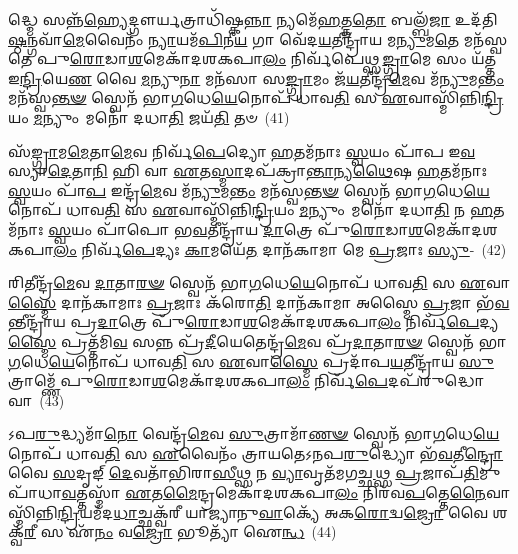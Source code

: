 𑌦𑍍𑌧𑍍𑌮𑍇 𑌸𑌨𑍍𑌨᳴\-\ul{𑌹𑍍𑌯𑍇}\-𑌦𑍍𑌗𑍗𑌰𑍍𑌯𑌤𑍍𑌰𑌾𑌧𑌿᳴𑌷𑍍𑌕\-\ul{𑌨𑍍𑌨𑌾} 𑌨𑍍𑌯𑌮𑍇᳴\-\ul{𑌹}\-𑌤𑍍𑌤\-\ul{𑌤𑍋} 𑌬𑌲𑍍𑌬᳴\-\ul{𑌜𑌾} 𑌉𑌦᳴𑌤𑌿\-\ul{𑌷𑍍𑌠}\-𑌨𑍍𑌗𑌵𑌾᳴\-\ul{𑌮𑍇}\-𑌵𑍈𑌨𑌂᳴ \ul{𑌨𑍍𑌯𑌾}\-𑌯𑌮᳴\-\ul{𑌪𑌿}\-𑌨𑍀\-\ul{𑌯} 𑌗𑌾 𑌵𑍇᳴𑌦\-\ul{𑌯}\-𑌤𑍀𑌨𑍍𑌦𑍍𑌰𑌾᳴𑌯 𑌮\-\ul{𑌨𑍍𑌯𑍁}\-𑌮\-\ul{𑌤𑍇} 𑌮𑌨᳴𑌸𑍍𑌵𑌤𑍇 𑌪𑍁\-\ul{𑌰𑍋}\-𑌡𑌾\-\ul{𑌶}\-𑌮𑍇𑌕𑌾᳴\-𑌦𑌶\-𑌕𑌪𑌾\-\ul{𑌲𑌂} 𑌨𑌿𑌰𑍍𑌵᳴𑌪𑍇𑌥𑍍𑌸\-\ul{𑌙𑍍𑌗𑍍𑌰𑌾}\-𑌮𑍇 𑌸𑌂 𑌯᳴𑌤𑍍𑌤 𑌇\-\ul{𑌨𑍍𑌦𑍍𑌰𑌿}\-𑌯𑍇\-\ul{𑌣} 𑌵𑍈 \ul{𑌮}\-𑌨𑍍𑌯𑍁\-\ul{𑌨𑌾} 𑌮𑌨᳴𑌸𑌾 𑌸\-\ul{𑌙𑍍𑌗𑍍𑌰𑌾}\-𑌮𑌂 𑌜᳴\-\ul{𑌯}\-𑌤𑍀𑌨𑍍𑌦𑍍𑌰᳴\-\ul{𑌮𑍇}\-𑌵 𑌮᳴\-\ul{𑌨𑍍𑌯𑍁}\-𑌮\-\ul{𑌨𑍍𑌤𑌂} 𑌮𑌨᳴𑌸𑍍𑌵\-\ul{𑌨𑍍𑌤}\-\-\ul{𑍟} 𑌸𑍍𑌵𑍇𑌨᳴ 𑌭𑌾\-\ul{𑌗}\-𑌧𑍇\-\ul{𑌯𑍇}\-𑌨𑍋𑌪᳴ 𑌧𑌾𑌵\-\ul{𑌤𑌿} 𑌸 \ul{𑌏}\-𑌵𑌾𑌸𑍍𑌮𑌿᳴𑌨𑍍𑌨𑌿\-\ul{𑌨𑍍𑌦𑍍𑌰𑌿}\-𑌯𑌂 \ul{𑌮}\-𑌨𑍍𑌯𑍁𑌂 𑌮𑌨𑍋᳴ 𑌦𑌧𑌾\-\ul{𑌤𑌿} 𑌜𑌯᳴\-\ul{𑌤𑌿} 𑌤𑍞~(41)

𑌸᳴\-\ul{𑌙𑍍𑌗𑍍𑌰𑌾}\-𑌮\-\ul{𑌮𑍇}\-𑌤𑌾\-\ul{𑌮𑍇}\-𑌵 𑌨𑌿𑌰𑍍𑌵᳴\-\ul{𑌪𑍇}\-𑌦𑍍𑌯𑍋 \ul{𑌹}\-𑌤𑌮᳴𑌨𑌾𑌃 \ul{𑌸𑍍𑌵}\-𑌯𑌂 𑌪𑌾᳴𑌪 𑌇\-\ul{𑌵} 𑌸𑍍𑌯𑌾\-\ul{𑌦𑍇}\-𑌤𑌾\-\ul{𑌨𑌿} 𑌹𑌿 𑌵𑌾 \ul{𑌏}\-𑌤\-\ul{𑌸𑍍𑌮𑌾}\-𑌦𑌪᳴𑌕𑍍𑌰𑌾\-\ul{𑌨𑍍𑌤𑌾}\-𑌨𑍍𑌯\-\ul{𑌥𑍈}\-𑌷 \ul{𑌹}\-𑌤𑌮᳴𑌨𑌾𑌃 \ul{𑌸𑍍𑌵}\-𑌯𑌂 𑌪𑌾᳴\-\ul{𑌪} 𑌇𑌨𑍍𑌦𑍍𑌰᳴\-\ul{𑌮𑍇}\-𑌵 𑌮᳴\-\ul{𑌨𑍍𑌯𑍁}\-𑌮\-\ul{𑌨𑍍𑌤𑌂} 𑌮𑌨᳴𑌸𑍍𑌵\-\ul{𑌨𑍍𑌤}\-\-\ul{𑍟} 𑌸𑍍𑌵𑍇𑌨᳴ 𑌭𑌾\-\ul{𑌗}\-𑌧𑍇\-\ul{𑌯𑍇}\-𑌨𑍋𑌪᳴ 𑌧𑌾𑌵\-\ul{𑌤𑌿} 𑌸 \ul{𑌏}\-𑌵𑌾𑌸𑍍𑌮𑌿᳴𑌨𑍍𑌨𑌿\-\ul{𑌨𑍍𑌦𑍍𑌰𑌿}\-𑌯𑌂 \ul{𑌮}\-𑌨𑍍𑌯𑍁𑌂 𑌮𑌨𑍋᳴ 𑌦𑌧𑌾\-\ul{𑌤𑌿} 𑌨 \ul{𑌹}\-𑌤𑌮᳴𑌨𑌾𑌃 \ul{𑌸𑍍𑌵}\-𑌯𑌂 𑌪𑌾᳴𑌪𑍋 𑌭\-\ul{𑌵}\-𑌤𑍀𑌨𑍍𑌦𑍍𑌰𑌾᳴𑌯 \ul{𑌦𑌾}\-𑌤𑍍𑌰𑍇 𑌪𑍁᳴\-\ul{𑌰𑍋}\-𑌡𑌾\-\ul{𑌶}\-𑌮𑍇𑌕𑌾᳴\-𑌦𑌶\-𑌕𑌪𑌾\-\ul{𑌲𑌂} 𑌨𑌿𑌰𑍍𑌵᳴\-\ul{𑌪𑍇}\-𑌦𑍍𑌯𑌃 \ul{𑌕𑌾}\-𑌮𑌯𑍇᳴\-\ul{𑌤} 𑌦𑌾𑌨᳴𑌕𑌾𑌮𑌾 𑌮𑍇 \ul{𑌪𑍍𑌰}\-𑌜𑌾𑌃 \ul{𑌸𑍍𑌯𑍁}\--~(42)

𑌰𑌿𑌤𑍀𑌨𑍍𑌦𑍍𑌰᳴\-\ul{𑌮𑍇}\-𑌵 \ul{𑌦𑌾}\-𑌤𑌾\-\ul{𑌰}\-\-\ul{𑍟} 𑌸𑍍𑌵𑍇𑌨᳴ 𑌭𑌾\-\ul{𑌗}\-𑌧𑍇\-\ul{𑌯𑍇}\-𑌨𑍋𑌪᳴ 𑌧𑌾𑌵\-\ul{𑌤𑌿} 𑌸 \ul{𑌏}\-𑌵𑌾\-\ul{𑌸𑍍𑌮𑍈} 𑌦𑌾𑌨᳴𑌕𑌾𑌮𑌾𑌃 \ul{𑌪𑍍𑌰}\-𑌜𑌾𑌃 𑌕᳴𑌰𑍋\-\ul{𑌤𑌿} 𑌦𑌾𑌨᳴𑌕𑌾𑌮𑌾 𑌅𑌸𑍍𑌮𑍈 \ul{𑌪𑍍𑌰}\-𑌜𑌾 𑌭᳴\-\ul{𑌵}\-𑌨𑍍𑌤𑍀𑌨𑍍𑌦𑍍𑌰𑌾᳴𑌯 𑌪𑍍𑌰\-\ul{𑌦𑌾}\-𑌤𑍍𑌰𑍇 𑌪𑍁᳴\-\ul{𑌰𑍋}\-𑌡𑌾\-\ul{𑌶}\-𑌮𑍇𑌕𑌾᳴\-𑌦𑌶\-𑌕𑌪𑌾\-\ul{𑌲𑌂} 𑌨𑌿𑌰𑍍𑌵᳴\-\ul{𑌪𑍇}\-𑌦𑍍𑌯\-\ul{𑌸𑍍𑌮𑍈} 𑌪𑍍𑌰𑌤𑍍𑌤᳴𑌮𑌿\-\ul{𑌵} 𑌸𑌨𑍍𑌨 𑌪𑍍𑌰᳴\-\ul{𑌦𑍀}\-𑌯𑍇𑌤𑍇𑌨𑍍𑌦𑍍𑌰᳴\-\ul{𑌮𑍇}\-𑌵 𑌪𑍍𑌰᳴\-\ul{𑌦𑌾}\-𑌤𑌾\-\ul{𑌰}\-\-\ul{𑍟} 𑌸𑍍𑌵𑍇𑌨᳴ 𑌭𑌾\-\ul{𑌗}\-𑌧𑍇\-\ul{𑌯𑍇}\-𑌨𑍋𑌪᳴ 𑌧𑌾𑌵\-\ul{𑌤𑌿} 𑌸 \ul{𑌏}\-𑌵𑌾\-\ul{𑌸𑍍𑌮𑍈} 𑌪𑍍𑌰𑌦𑌾᳴𑌪\-\ul{𑌯}\-𑌤𑍀𑌨𑍍𑌦𑍍𑌰𑌾᳴𑌯 \ul{𑌸𑍁}\-𑌤𑍍𑌰𑌾𑌮𑍍𑌣𑍇᳴ 𑌪𑍁\-\ul{𑌰𑍋}\-𑌡𑌾\-\ul{𑌶}\-𑌮𑍇𑌕𑌾᳴\-𑌦𑌶\-𑌕𑌪𑌾\-\ul{𑌲𑌂} 𑌨𑌿𑌰𑍍𑌵᳴\-\ul{𑌪𑍇}\-𑌦𑌪᳴𑌰𑍁𑌦𑍍𑌧𑍋 𑌵𑌾\-~(43)

𑌽𑌪\-\ul{𑌰𑍁}\-𑌦𑍍𑌧𑍍𑌯𑌮𑌾᳴\-\ul{𑌨𑍋} 𑌵𑍇𑌨𑍍𑌦𑍍𑌰᳴\-\ul{𑌮𑍇}\-𑌵 \ul{𑌸𑍁}\-𑌤𑍍𑌰𑌾𑌮𑌾᳴\-\ul{𑌣}\-\-\ul{𑍟} 𑌸𑍍𑌵𑍇𑌨᳴ 𑌭𑌾\-\ul{𑌗}\-𑌧𑍇\-\ul{𑌯𑍇}\-𑌨𑍋𑌪᳴ 𑌧𑌾𑌵\-\ul{𑌤𑌿} 𑌸 \ul{𑌏}\-𑌵𑍈𑌨𑌂᳴ 𑌤𑍍𑌰𑌾𑌯𑌤𑍇\-𑌽𑌨𑌪\-\ul{𑌰𑍁}\-𑌦𑍍𑌧𑍍𑌯𑍋 𑌭᳴\-\ul{𑌵}\-𑌤𑍀\-\ul{𑌨𑍍𑌦𑍍𑌰𑍋} 𑌵𑍈 \ul{𑌸}\-𑌦𑍃𑌙𑍍 \ul{𑌦𑍇}\-𑌵𑌤𑌾᳴𑌭𑌿𑌰𑌾\-\ul{𑌸𑍀}\-𑌥𑍍𑌸 𑌨 \ul{𑌵𑍍𑌯𑌾}\-𑌵𑍃𑌤᳴𑌮𑌗\-\ul{𑌚𑍍𑌛}\-𑌥𑍍𑌸 \ul{𑌪𑍍𑌰}\-𑌜𑌾𑌪᳴\-\ul{𑌤𑌿}\-𑌮𑍁𑌪𑌾᳴\-𑌧𑌾\-\ul{𑌵}\-𑌤𑍍𑌤𑌸𑍍𑌮𑌾᳴ \ul{𑌏}\-𑌤\-\ul{𑌮𑍈}\-𑌨𑍍𑌦𑍍𑌰𑌮𑍇𑌕𑌾᳴\-𑌦𑌶\-𑌕𑌪𑌾\-\ul{𑌲𑌂} 𑌨𑌿𑌰᳴𑌵\-\ul{𑌪}\-𑌤𑍍𑌤𑍇\-\ul{𑌨𑍈}\-𑌵𑌾𑌸𑍍𑌮𑌿᳴𑌨𑍍𑌨𑌿\-\ul{𑌨𑍍𑌦𑍍𑌰𑌿}\-𑌯\-𑌮᳴𑌦\-\ul{𑌧𑌾}\-𑌚𑍍𑌛𑌕𑍍𑌵᳴𑌰𑍀 𑌯𑌾𑌜𑍍𑌯𑌾𑌨𑍁\-\ul{𑌵𑌾}\-𑌕𑍍𑌯𑍇᳴ 𑌅𑌕\-\ul{𑌰𑍋}\-𑌦𑍍𑌵\-\ul{𑌜𑍍𑌰𑍋} 𑌵𑍈 𑌶𑌕𑍍𑌵᳴\-\ul{𑌰𑍀} 𑌸 𑌏᳴\-\ul{𑌨𑌂} 𑌵\-\ul{𑌜𑍍𑌰𑍋} 𑌭𑍂𑌤𑍍𑌯𑌾᳴ 𑌐\-\ul{𑌨𑍍𑌧}\-~(44)

